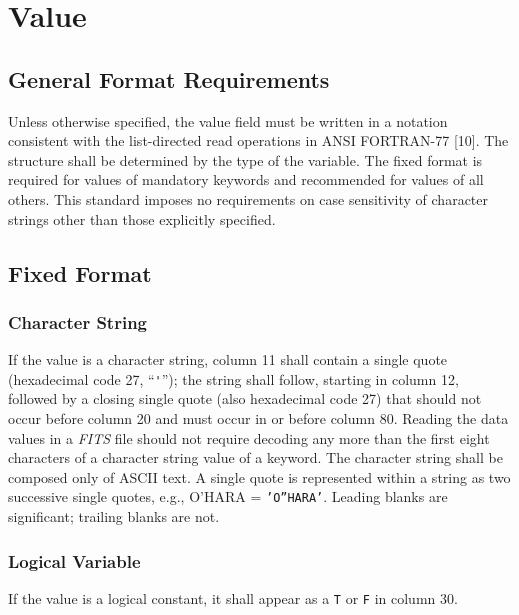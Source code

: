   \section{Value}
   \label{s:valC}

    \subsection{General Format Requirements}  
   \label{s:GFR}
   Unless otherwise specified, the value field 
   must be written in a notation consistent with the 
   list-directed
   read operations in 
   ANSI FORTRAN-77 [10]. 
   The structure shall be determined by the type of the variable. 
   The fixed format is required for values of 
   mandatory keywords
   and recommended for values of all others.  This standard imposes no 
   requirements on case sensitivity
   of character strings
   other than those explicitly specified.

  \subsection{Fixed Format} 
  
   \subsubsection{Character String}  
    \label{s:ffch}
   If the value is a character string, column 11 shall 
   contain
   a single quote (hexadecimal code 27, ``\verb+'+''); the string shall follow, 
   starting in column 12, followed by a closing single quote
   (also hexadecimal code 27) that should not occur before
   column 20 and must occur in or before column 80.  Reading the 
   data values in a {\em FITS\/} file should not require 
   decoding any more than the first eight characters of 
   a character string value of a keyword.  The character string 
   shall be composed only of ASCII text. 
   A single quote is represented within a string as two successive 
   single quotes, e.g., O'HARA = {\tt 'O''HARA'}. Leading blanks are
   significant; trailing blanks are not.    
  
   \subsubsection{Logical Variable}
   If the value is a logical constant, it shall appear as a {\tt T}
   or {\tt F} in column 30.
  
